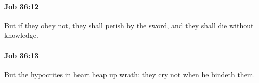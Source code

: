 		\paragraph{Job 36:12} %
			\label{JOB-36-12}

			But if they obey not, they shall perish by the sword, and they shall die without knowledge.


		\paragraph{Job 36:13} %
			\label{JOB-36-13}

			But the hypocrites in heart heap up wrath: they cry not when he bindeth them.


